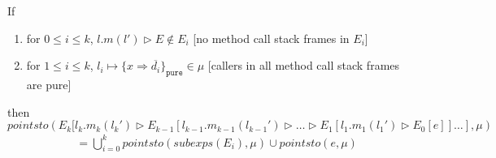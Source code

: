 \documentclass{llncs}
\newcommand{\keywadj}[1]{\mathtt{#1}}
\newcommand{\intuition}[1]{#1}
\begin{document}
\begin{mdframed}
\begin{lemma}
\label{l:pt-all-pure}
If
\begin{enumerate}
\item for $0 \leq i \leq k$, $l.m(l') \rhd E \not\in E_i$ \intuition{\hspace{150pt} [no method call stack frames in $E_i$]}
\item for $1 \leq i \leq k$, $l_i \mapsto \{ x \Rightarrow \overline{d_i} \}_{\keywadj{pure}} \in \mu$ \intuition{\hspace{70pt} [callers in all method call stack frames are pure]}
\end{enumerate}
then
\noindent$pointsto(E_k[l_k.m_k(l_k') \rhd E_{k-1}[l_{k-1}.m_{k-1}(l_{k-1}') \rhd \dots \rhd E_1[l_1.m_1(l_1') \rhd E_0[e]] \dots ], \mu)$
\vspace{-7pt}
\begin{align*}
&= \bigcup^k_{i = 0} pointsto(subexps(E_i), \mu) \cup pointsto(e, \mu)
\end{align*}
\end{lemma}
\end{mdframed}
\end{document}
